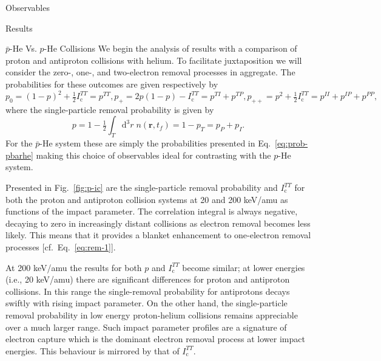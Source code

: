 \documentclass[letterpaper, 11 pt]{report}
\begin{document}
\begin{chapter}{Observables \label{chap:p-he2p-he}}
\begin{section}{Results \label{sec:phe2p-res}}
\begin{subsection}{ \texorpdfstring{$\bar{p}$}{pbar}-He Vs. \texorpdfstring{$p$}{p}-He Collisions
                         \label{sec:pbarhe-res}}
         We begin the analysis of results with a comparison of proton and antiproton collisions with
         helium. To facilitate juxtaposition we will consider the zero-, one-, and two-electron removal
         processes in aggregate. The probabilities for these outcomes are given respectively by
         \begin{subequations} \label{eq:remove}
            \begin{equation} \label{eq:rem-0}
               p_0 = (1 - p)^2 + \tfrac{1}{2} I^{TT}_\mathrm{c} = p^{TT},
            \end{equation}
            \begin{equation} \label{eq:rem-1}
               p_+ = 2 p (1-p) - I^{TT}_\mathrm{c} = p^{TI} + p^{TP},
            \end{equation}
            \begin{equation} \label{eq:rem-2}
               p_{++} = p^2 + \tfrac{1}{2} I^{TT}_\mathrm{c} = p^{II} + p^{IP} + p^{PP},
            \end{equation}
         \end{subequations}
         where the single-particle removal probability is given by
         \begin{equation} \label{eq:p-rem}
            p = 1 - \tfrac{1}{2} \int_T \mathrm{d}^3 r \; n(\mathbf{r},t_f)
            = 1 - p_T = p_P + p_I.
         \end{equation}
         For the $\bar{p}$-He system these are simply the probabilities presented in
         Eq.~\eqref{eq:prob-pbarhe} making this choice of observables ideal for contrasting with the
         $p$-He system.

         Presented in Fig.~\ref{fig:p-ic} are the single-particle removal probability and
         $I^{TT}_\mathrm{c}$ for both the proton and antiproton collision systems at 20 and 200 keV/amu
         as functions of the impact parameter. The correlation integral is always negative, decaying to
         zero in increasingly distant collisions as electron removal becomes less likely. This means
         that it provides a blanket enhancement to one-electron removal processes
         [cf.\ Eq.~\eqref{eq:rem-1}]. 

         At 200 keV/amu the results for both $p$ and $I^{TT}_\mathrm{c}$ become similar; at lower
         energies (i.e., 20 keV/amu) there are significant differences for proton and antiproton
         collisions. In this range the single-removal probability for antiprotons decays swiftly with
         rising impact parameter. On the other hand, the single-particle removal probability in low
         energy proton-helium collisions remains appreciable over a much larger range. Such impact
         parameter profiles are a signature of electron capture which is the dominant electron removal
         process at lower impact energies. This behaviour is mirrored by that of $I^{TT}_\mathrm{c}$.


\end{subsection}
\end{section}
\end{chapter}
\end{document}
